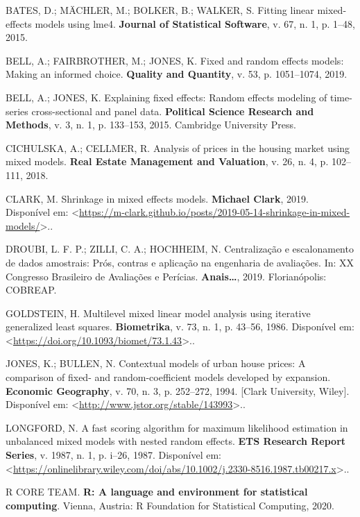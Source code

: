 \documentclass[
  a4paper, 11pt]{article}
\begin{document}
\leavevmode\hypertarget{ref-Bates}{}%
BATES, D.; MÄCHLER, M.; BOLKER, B.; WALKER, S. Fitting linear
mixed-effects models using lme4. \textbf{Journal of Statistical
Software}, v. 67, n. 1, p. 1--48, 2015.

\leavevmode\hypertarget{ref-bell2019}{}%
BELL, A.; FAIRBROTHER, M.; JONES, K. Fixed and random effects models:
Making an informed choice. \textbf{Quality and Quantity}, v. 53, p.
1051--1074, 2019.

\leavevmode\hypertarget{ref-bell2015}{}%
BELL, A.; JONES, K. Explaining fixed effects: Random effects modeling of
time-series cross-sectional and panel data. \textbf{Political Science
Research and Methods}, v. 3, n. 1, p. 133--153, 2015. Cambridge
University Press.

\leavevmode\hypertarget{ref-polonia}{}%
CICHULSKA, A.; CELLMER, R. Analysis of prices in the housing market
using mixed models. \textbf{Real Estate Management and Valuation}, v.
26, n. 4, p. 102--111, 2018.

\leavevmode\hypertarget{ref-clark2019shrinkage}{}%
CLARK, M. Shrinkage in mixed effects models. \textbf{Michael Clark},
2019. Disponível em:
\textless{}\url{https://m-clark.github.io/posts/2019-05-14-shrinkage-in-mixed-models/}\textgreater..

\leavevmode\hypertarget{ref-droubi2019}{}%
DROUBI, L. F. P.; ZILLI, C. A.; HOCHHEIM, N. Centralização e
escalonamento de dados amostrais: Prós, contras e aplicação na
engenharia de avaliações. In: XX Congresso Brasileiro de Avaliações e
Perícias. \textbf{Anais\ldots{}}, 2019. Florianópolis: COBREAP.

\leavevmode\hypertarget{ref-goldstein}{}%
GOLDSTEIN, H. Multilevel mixed linear model analysis using iterative
generalized least squares. \textbf{Biometrika}, v. 73, n. 1, p. 43--56,
1986. Disponível em:
\textless{}\url{https://doi.org/10.1093/biomet/73.1.43}\textgreater..

\leavevmode\hypertarget{ref-jones1994}{}%
JONES, K.; BULLEN, N. Contextual models of urban house prices: A
comparison of fixed- and random-coefficient models developed by
expansion. \textbf{Economic Geography}, v. 70, n. 3, p. 252--272, 1994.
{[}Clark University, Wiley{]}. Disponível em:
\textless{}\url{http://www.jstor.org/stable/143993}\textgreater..

\leavevmode\hypertarget{ref-longford}{}%
LONGFORD, N. A fast scoring algorithm for maximum likelihood estimation
in unbalanced mixed models with nested random effects. \textbf{ETS
Research Report Series}, v. 1987, n. 1, p. i--26, 1987. Disponível em:
\textless{}\url{https://onlinelibrary.wiley.com/doi/abs/10.1002/j.2330-8516.1987.tb00217.x}\textgreater..

\leavevmode\hypertarget{ref-R}{}%
R CORE TEAM. \textbf{R: A language and environment for statistical
computing}. Vienna, Austria: R Foundation for Statistical Computing,
2020.
\end{document}
